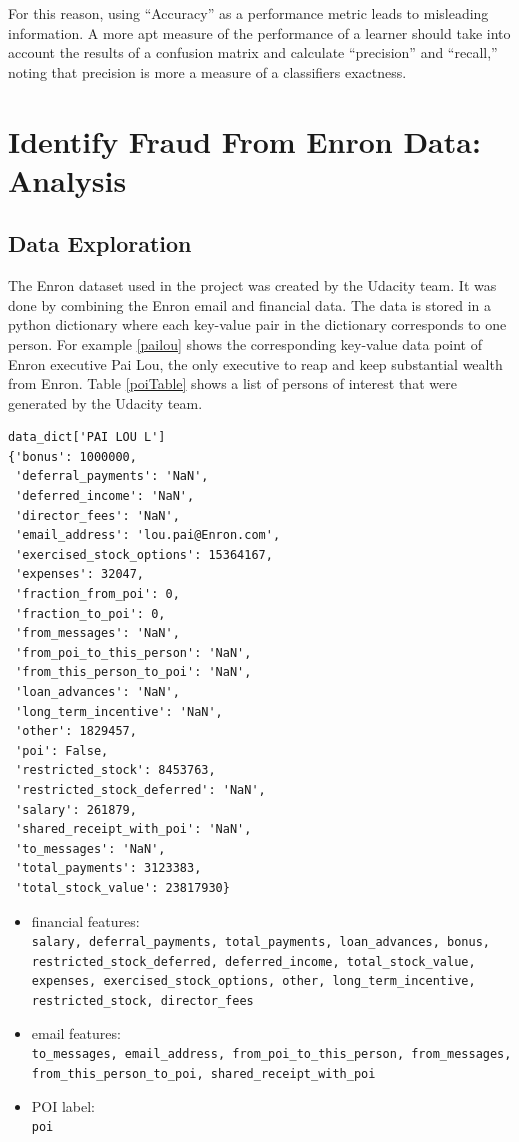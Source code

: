 \documentclass[twoside,openright,titlepage,numbers=noenddot,headinclude,%
               footinclude=true,cleardoublepage=empty,abstractoff,BCOR=5mm,%
               paper=a4,fontsize=11pt,ngerman,american]{scrreprt}
\numberwithin{theorem}{chapter}
\numberwithin{definition}{chapter}
\numberwithin{algorithm}{chapter}
\numberwithin{figure}{chapter}
\numberwithin{table}{chapter}
\numberwithin{equation}{chapter}
\begin{document}
For this reason, using ``Accuracy'' as a performance metric leads to misleading information. A more apt measure of the performance of a learner should take into account the results of a confusion matrix and  calculate ``precision'' and ``recall,'' noting that precision is more a measure of a classifiers exactness.



\chapter*{Identify Fraud From Enron Data: Analysis}

\section*{Data Exploration}

The Enron dataset used in the project was created by the Udacity team. It was done by combining the Enron email and financial data. The data is stored in a python dictionary where each key-value pair in the dictionary corresponds to one person. For example \ref{pailou} shows the corresponding key-value data point of Enron executive Pai Lou, the only executive to reap and keep substantial wealth from Enron. Table \ref{poiTable} shows a list of persons of interest that were generated by the Udacity team.
\label{pailou}
\begin{verbatim}
data_dict['PAI LOU L']
{'bonus': 1000000,
 'deferral_payments': 'NaN',
 'deferred_income': 'NaN',
 'director_fees': 'NaN',
 'email_address': 'lou.pai@Enron.com',
 'exercised_stock_options': 15364167,
 'expenses': 32047,
 'fraction_from_poi': 0,
 'fraction_to_poi': 0,
 'from_messages': 'NaN',
 'from_poi_to_this_person': 'NaN',
 'from_this_person_to_poi': 'NaN',
 'loan_advances': 'NaN',
 'long_term_incentive': 'NaN',
 'other': 1829457,
 'poi': False,
 'restricted_stock': 8453763,
 'restricted_stock_deferred': 'NaN',
 'salary': 261879,
 'shared_receipt_with_poi': 'NaN',
 'to_messages': 'NaN',
 'total_payments': 3123383,
 'total_stock_value': 23817930}
\end{verbatim}


\begin{itemize}%
\item financial features:\\ \texttt{salary, deferral\_payments, total\_payments, loan\_advances, bonus, restricted\_stock\_deferred, deferred\_income, total\_stock\_value, expenses, exercised\_stock\_options, other, long\_term\_incentive, restricted\_stock, director\_fees}

\item email features:\\ \texttt{to\_messages, email\_address, from\_poi\_to\_this\_person, from\_messages, from\_this\_person\_to\_poi, shared\_receipt\_with\_poi}

\item POI label:\\ \texttt{poi}
\end{itemize}
\end{document}

